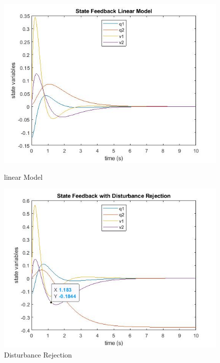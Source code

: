 \documentclass[12pt]{article}
\begin{document}
\begin{figure}[H]
\centering
\begin{minipage}{.5\textwidth}
	\centering
	\includegraphics[width=.8\linewidth]{State feedback Linear Model.jpg}
	\caption{linear Model}
	\end{minipage}%
\begin{minipage}{.5\textwidth}
	\centering
	\includegraphics[width=.8\linewidth]{Disturbance rejection.jpg}
	\caption{Disturbance Rejection}
\end{minipage}
\end{figure}
\end{document}
